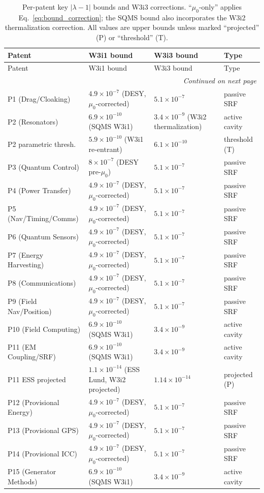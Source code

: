 \documentclass[11pt,twocolumn]{article}
\newcommand{\lam}{\lambda}
\newcommand{\ee}[1]{\times 10^{#1}}
\begin{document}
\begin{longtable}{@{}llll@{}}
\caption{Per-patent key $|\lam-1|$ bounds and W3i3 corrections.
``$\mu_0$-only'' applies Eq.~\eqref{eq:bound_correction}; the SQMS
bound also incorporates the W3i2 thermalization correction.
All values are upper bounds unless marked ``projected'' (P) or
``threshold'' (T).}
\label{tab:all_patent_bounds}\\
\toprule
Patent & W3i1 bound & W3i3 bound & Type \\
\midrule
\endfirsthead
\toprule
Patent & W3i1 bound & W3i3 bound & Type \\
\midrule
\endhead
\midrule
\multicolumn{4}{r}{\textit{Continued on next page}}\\
\endfoot
\bottomrule
\endlastfoot
P1 (Drag/Cloaking) & $4.9\ee{-7}$ (DESY, $\mu_0$-corrected)
  & $5.1\ee{-7}$ & passive SRF \\
P2 (Resonators) & $6.9\ee{-10}$ (SQMS W3i1)
  & $3.4\ee{-9}$ (W3i2 thermalization) & active cavity \\
P2 parametric thresh. & $5.9\ee{-10}$ (W3i1 re-entrant)
  & $6.1\ee{-10}$ & threshold (T) \\
P3 (Quantum Control) & $8\ee{-7}$ (DESY pre-$\mu_0$)
  & $5.1\ee{-7}$ & passive SRF \\
P4 (Power Transfer) & $4.9\ee{-7}$ (DESY, $\mu_0$-corrected)
  & $5.1\ee{-7}$ & passive SRF \\
P5 (Nav/Timing/Comms) & $4.9\ee{-7}$ (DESY, $\mu_0$-corrected)
  & $5.1\ee{-7}$ & passive SRF \\
P6 (Quantum Sensors) & $4.9\ee{-7}$ (DESY, $\mu_0$-corrected)
  & $5.1\ee{-7}$ & passive SRF \\
P7 (Energy Harvesting) & $4.9\ee{-7}$ (DESY, $\mu_0$-corrected)
  & $5.1\ee{-7}$ & passive SRF \\
P8 (Communications) & $4.9\ee{-7}$ (DESY, $\mu_0$-corrected)
  & $5.1\ee{-7}$ & passive SRF \\
P9 (Field Nav/Position) & $4.9\ee{-7}$ (DESY, $\mu_0$-corrected)
  & $5.1\ee{-7}$ & passive SRF \\
P10 (Field Computing) & $6.9\ee{-10}$ (SQMS W3i1)
  & $3.4\ee{-9}$ & active cavity \\
P11 (EM Coupling/SRF) & $6.9\ee{-10}$ (SQMS W3i1)
  & $3.4\ee{-9}$ & active cavity \\
P11 ESS projected & $1.1\ee{-14}$ (ESS Lund, W3i2 projected)
  & $1.14\ee{-14}$ & projected (P) \\
P12 (Provisional Energy) & $4.9\ee{-7}$ (DESY, $\mu_0$-corrected)
  & $5.1\ee{-7}$ & passive SRF \\
P13 (Provisional GPS) & $4.9\ee{-7}$ (DESY, $\mu_0$-corrected)
  & $5.1\ee{-7}$ & passive SRF \\
P14 (Provisional ICC) & $4.9\ee{-7}$ (DESY, $\mu_0$-corrected)
  & $5.1\ee{-7}$ & passive SRF \\
P15 (Generator Methods) & $6.9\ee{-10}$ (SQMS W3i1)
  & $3.4\ee{-9}$ & active cavity \\
\end{longtable}
\end{document}
